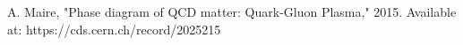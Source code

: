 A. Maire, "Phase diagram of QCD matter: Quark-Gluon Plasma," 2015. Available at: https://cds.cern.ch/record/2025215
